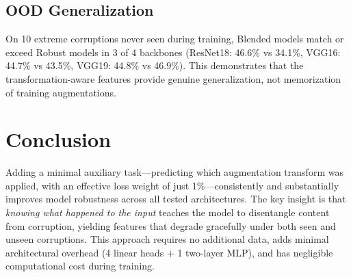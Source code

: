 \documentclass[11pt,a4paper]{article}
\begin{document}
\subsection{OOD Generalization}

On 10 extreme corruptions never seen during training, Blended models match or exceed Robust models in 3 of 4 backbones (ResNet18: 46.6\% vs 34.1\%, VGG16: 44.7\% vs 43.5\%, VGG19: 44.8\% vs 46.9\%). This demonstrates that the transformation-aware features provide genuine generalization, not memorization of training augmentations.

\section{Conclusion}

Adding a minimal auxiliary task---predicting which augmentation transform was applied, with an effective loss weight of just 1\%---consistently and substantially improves model robustness across all tested architectures. The key insight is that \emph{knowing what happened to the input} teaches the model to disentangle content from corruption, yielding features that degrade gracefully under both seen and unseen corruptions. This approach requires no additional data, adds minimal architectural overhead (4 linear heads + 1 two-layer MLP), and has negligible computational cost during training.
\end{document}
